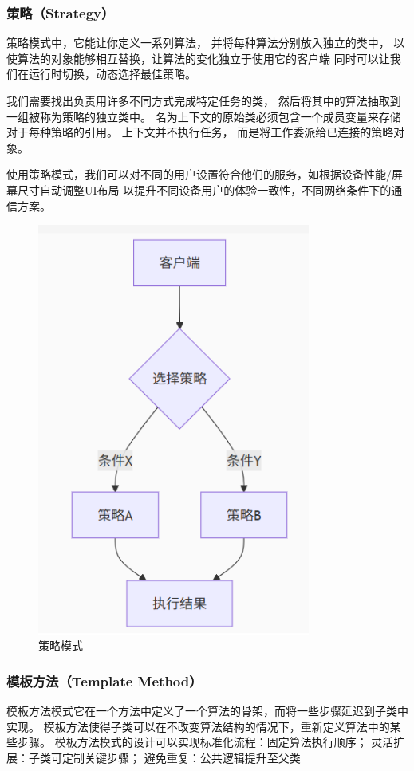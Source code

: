 \documentclass[12pt]{ctexart} %
\begin{document}
\subsubsection{策略（Strategy）} 
策略模式中，它能让你定义一系列算法， 
并将每种算法分别放入独立的类中， 以使算法的对象能够相互替换，让算法的变化独立于使用它的客户端
同时可以让我们在运行时切换，动态选择最佳策略。

我们需要找出负责用许多不同方式完成特定任务的类， 然后将其中的算法抽取到一组被称为策略的独立类中。
名为上下文的原始类必须包含一个成员变量来存储对于每种策略的引用。 上下文并不执行任务， 
而是将工作委派给已连接的策略对象。

使用策略模式，我们可以对不同的用户设置符合他们的服务，如根据设备性能/屏幕尺寸自动调整UI布局
以提升不同设备用户的体验一致性，不同网络条件下的通信方案。

\begin{figure}[H]
  \centering
  \includegraphics[width=0.8\textwidth]{celv.png}
  \caption{策略模式}
\end{figure}
\subsubsection{模板方法（Template Method）} 
模板方法模式它在一个方法中定义了一个算法的骨架，而将一些步骤延迟到子类中实现。
模板方法使得子类可以在不改变算法结构的情况下，重新定义算法中的某些步骤。
模板方法模式的设计可以实现标准化流程：固定算法执行顺序；
灵活扩展：子类可定制关键步骤；
避免重复：公共逻辑提升至父类
\end{document}
